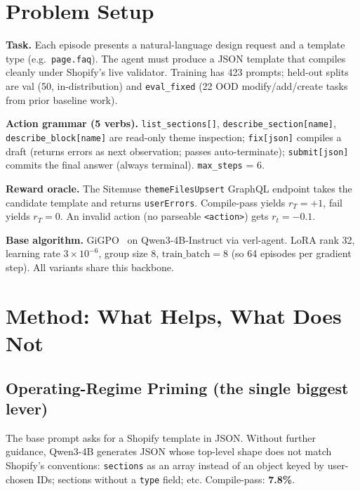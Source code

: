 \documentclass[10pt]{article}
\begin{document}
\section{Problem Setup}
\label{sec:setup}

\textbf{Task.} Each episode presents a natural-language design request and a
template type (e.g.\ \texttt{page.faq}). The agent must produce a JSON template
that compiles cleanly under Shopify's live validator. Training has 423 prompts;
held-out splits are val (50, in-distribution) and \texttt{eval\_fixed} (22 OOD
modify/add/create tasks from prior baseline work).

\textbf{Action grammar (5 verbs).}
\texttt{list\_sections[]}, \texttt{describe\_section[name]},
\texttt{describe\_block[name]} are read-only theme inspection;
\texttt{fix[json]} compiles a draft (returns errors as next observation; passes
auto-terminate); \texttt{submit[json]} commits the final answer
(always terminal). \texttt{max\_steps} = 6.

\textbf{Reward oracle.} The Sitemuse \texttt{themeFilesUpsert} GraphQL endpoint
takes the candidate template and returns \texttt{userErrors}. Compile-pass
yields $r_T = +1$, fail yields $r_T = 0$. An invalid action (no parseable
\texttt{<action>}) gets $r_t = -0.1$.

\textbf{Base algorithm.} GiGPO~\cite{zeng2025gigpo} on Qwen3-4B-Instruct via
verl-agent. LoRA rank 32, learning rate $3{\times}10^{-6}$, group size 8,
$\mathrm{train\_batch}=8$ (so 64 episodes per gradient step). All variants
share this backbone.

\section{Method: What Helps, What Does Not}
\label{sec:method}

\subsection{Operating-Regime Priming (the single biggest lever)}

The base prompt asks for a Shopify template in JSON. Without further
guidance, Qwen3-4B generates JSON whose top-level shape does not match
Shopify's conventions: \texttt{sections} as an array instead of an object
keyed by user-chosen IDs; sections without a \texttt{type} field; etc.
Compile-pass: \textbf{7.8\%}.
\end{document}
